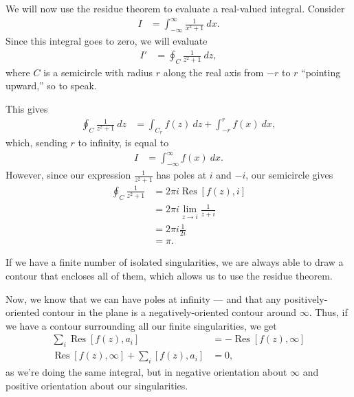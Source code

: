\documentclass[10pt]{mypackage}
\DeclareMathOperator{\res}{Res}
\begin{document}
\begin{example}
  We will now use the residue theorem to evaluate a real-valued integral. Consider
  \begin{align*}
    I &= \int_{-\infty}^{\infty} \frac{1}{x^2 + 1}\:dx.
  \end{align*}
  Since this integral goes to zero, we will evaluate
  \begin{align*}
    I' &= \oint_{C} \frac{1}{z^2 + 1}\:dz,
  \end{align*}
  where $C$ is a semicircle with radius $r$ along the real axis from $-r$ to $r$ ``pointing upward,'' so to speak.\newline

  This gives
  \begin{align*}
    \oint_{C} \frac{1}{z^2 + 1}\:dz &= \int_{C_r}f(z)\:dz + \int_{-r}^{r} f(x)\:dx,
  \end{align*}
  which, sending $r$ to infinity, is equal to
  \begin{align*}
    I &= \int_{-\infty}^{\infty} f(x)\:dx.
  \end{align*}
  However, since our expression $\frac{1}{z^2 + 1}$ has poles at $i$ and $-i$, our semicircle gives
  \begin{align*}
    \oint_{C}\frac{1}{z^2 + 1} &= 2\pi i\res\left[ f(z),i \right]\\
                               &= 2\pi i\lim_{z\rightarrow i}\frac{1}{z+i}\\
                               &= 2\pi i\frac{1}{2i}\\
                               &= \pi.
  \end{align*}
\end{example}
  If we have a finite number of isolated singularities, we are always able to draw a contour that encloses all of them, which allows us to use the residue theorem.\newline

  Now, we know that we can have poles at infinity --- and that any positively-oriented contour in the plane is a negatively-oriented contour around $\infty$. Thus, if we have a contour surrounding all our finite singularities, we get
  \begin{align*}
    \sum_{i}\res\left[ f(z),a_i \right] &= -\res\left[ f(z),\infty \right]\\
    \res\left[ f(z),\infty \right] + \sum_{i}\left[ f(z),a_i \right] &= 0,
  \end{align*}
  as we're doing the same integral, but in negative orientation about $\infty$ and positive orientation about our singularities. \newline
\end{document}
